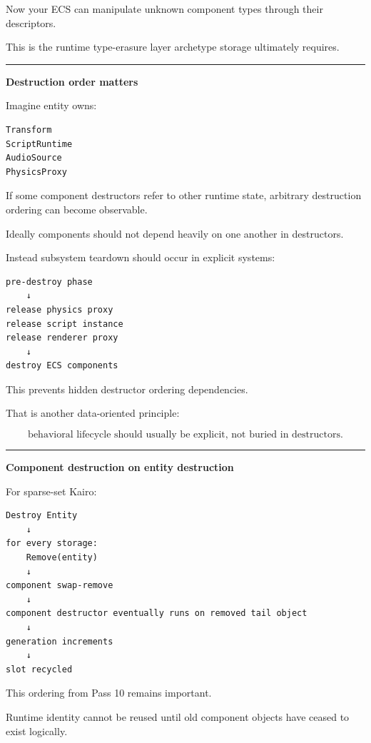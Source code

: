Now your ECS can manipulate unknown component types through their descriptors.

This is the runtime type-erasure layer archetype storage ultimately requires.

\begin{center}\rule{0.5\linewidth}{0.5pt}\end{center}

\textbf{Destruction order matters}

Imagine entity owns:

\begin{verbatim}
Transform
ScriptRuntime
AudioSource
PhysicsProxy
\end{verbatim}

If some component destructors refer to other runtime state, arbitrary destruction ordering can become observable.

Ideally components should not depend heavily on one another in destructors.

Instead subsystem teardown should occur in explicit systems:

\begin{verbatim}
pre-destroy phase
    ↓
release physics proxy
release script instance
release renderer proxy
    ↓
destroy ECS components
\end{verbatim}

This prevents hidden destructor ordering dependencies.

That is another data-oriented principle:

\[
\boxed{
\text{behavioral lifecycle should usually be explicit,
not buried in destructors}.
}
\]

\begin{center}\rule{0.5\linewidth}{0.5pt}\end{center}

\textbf{Component destruction on entity destruction}

For sparse-set Kairo:

\begin{verbatim}
Destroy Entity
    ↓
for every storage:
    Remove(entity)
    ↓
component swap-remove
    ↓
component destructor eventually runs on removed tail object
    ↓
generation increments
    ↓
slot recycled
\end{verbatim}

This ordering from Pass 10 remains important.

Runtime identity cannot be reused until old component objects have ceased to exist logically.

